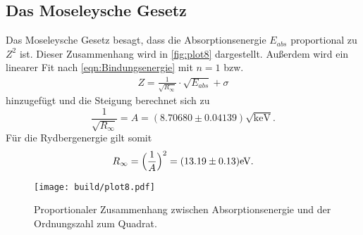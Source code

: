
\subsection{Das Moseleysche Gesetz} %
\label{sub:Das Moseleysche Gesetz}
Das Moseleysche Gesetz besagt, dass die Absorptionsenergie $E_{abs}$ proportional zu $Z^2$ ist.
Dieser Zusammenhang wird in \autoref{fig:plot8} dargestellt. Außerdem wird ein linearer Fit
nach \autoref{eqn:Bindungsenergie} mit $n=1$ bzw.
\begin{align*}
  Z= \frac{1}{\sqrt{R_\infty}} \cdot \sqrt{E_{abs}} + \sigma
\end{align*} hinzugefügt
und die Steigung berechnet sich zu
\begin{equation}
  \frac{1}{\sqrt{R_\infty}} = A = (8.70680 \pm 0.04139) \sqrt{\si{\kilo\electronvolt}}.
\end{equation}
Für die Rydbergenergie gilt somit
\begin{align}
  R_{\infty} = \Bigl(\frac{1}{A}\Bigr)^2 = (13.19 \pm 0.13) \si{\electronvolt}.
\end{align}

\begin{figure}[H]
  \centering
  \texttt{[image: build/plot8.pdf]}
  \caption{Proportionaler Zusammenhang zwischen Absorptionsenergie und der Ordnungszahl zum Quadrat.}
  \label{fig:plot8}
\end{figure}

